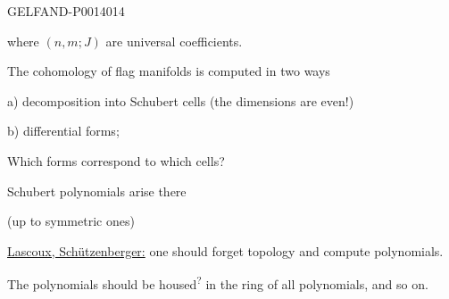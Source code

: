\begin{GelfandAdjacentEvidence}{GELFAND-P001401}{4}


where \((n,m;J)\) are universal coefficients.

The cohomology of flag manifolds is computed in two ways

a) decomposition into Schubert cells (the dimensions are even!)

b) differential forms;

Which forms correspond to which cells?

Schubert polynomials arise there

(up to symmetric ones)

\uline{Lascoux, Schützenberger:} one should forget topology and compute polynomials.

The polynomials should be
housed\textsuperscript{?}
in the ring of all polynomials, and so on.

\end{GelfandAdjacentEvidence}



